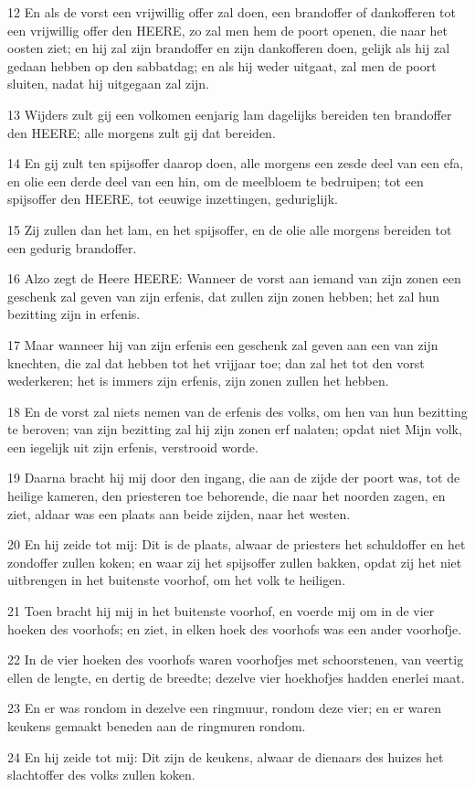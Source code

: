 \par 12 En als de vorst een vrijwillig offer zal doen, een brandoffer of dankofferen tot een vrijwillig offer den HEERE, zo zal men hem de poort openen, die naar het oosten ziet; en hij zal zijn brandoffer en zijn dankofferen doen, gelijk als hij zal gedaan hebben op den sabbatdag; en als hij weder uitgaat, zal men de poort sluiten, nadat hij uitgegaan zal zijn.
\par 13 Wijders zult gij een volkomen eenjarig lam dagelijks bereiden ten brandoffer den HEERE; alle morgens zult gij dat bereiden.
\par 14 En gij zult ten spijsoffer daarop doen, alle morgens een zesde deel van een efa, en olie een derde deel van een hin, om de meelbloem te bedruipen; tot een spijsoffer den HEERE, tot eeuwige inzettingen, geduriglijk.
\par 15 Zij zullen dan het lam, en het spijsoffer, en de olie alle morgens bereiden tot een gedurig brandoffer.
\par 16 Alzo zegt de Heere HEERE: Wanneer de vorst aan iemand van zijn zonen een geschenk zal geven van zijn erfenis, dat zullen zijn zonen hebben; het zal hun bezitting zijn in erfenis.
\par 17 Maar wanneer hij van zijn erfenis een geschenk zal geven aan een van zijn knechten, die zal dat hebben tot het vrijjaar toe; dan zal het tot den vorst wederkeren; het is immers zijn erfenis, zijn zonen zullen het hebben.
\par 18 En de vorst zal niets nemen van de erfenis des volks, om hen van hun bezitting te beroven; van zijn bezitting zal hij zijn zonen erf nalaten; opdat niet Mijn volk, een iegelijk uit zijn erfenis, verstrooid worde.
\par 19 Daarna bracht hij mij door den ingang, die aan de zijde der poort was, tot de heilige kameren, den priesteren toe behorende, die naar het noorden zagen, en ziet, aldaar was een plaats aan beide zijden, naar het westen.
\par 20 En hij zeide tot mij: Dit is de plaats, alwaar de priesters het schuldoffer en het zondoffer zullen koken; en waar zij het spijsoffer zullen bakken, opdat zij het niet uitbrengen in het buitenste voorhof, om het volk te heiligen.
\par 21 Toen bracht hij mij in het buitenste voorhof, en voerde mij om in de vier hoeken des voorhofs; en ziet, in elken hoek des voorhofs was een ander voorhofje.
\par 22 In de vier hoeken des voorhofs waren voorhofjes met schoorstenen, van veertig ellen de lengte, en dertig de breedte; dezelve vier hoekhofjes hadden enerlei maat.
\par 23 En er was rondom in dezelve een ringmuur, rondom deze vier; en er waren keukens gemaakt beneden aan de ringmuren rondom.
\par 24 En hij zeide tot mij: Dit zijn de keukens, alwaar de dienaars des huizes het slachtoffer des volks zullen koken.

